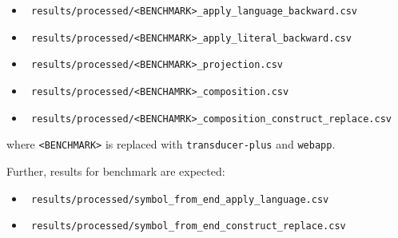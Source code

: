 \begin{itemize}
\begin{itemize}
    \item \texttt{
    results/processed/<BENCHMARK>\_apply\_language\_backward.csv
    }
    \item \texttt{
      results/processed/<BENCHMARK>\_apply\_literal\_backward.csv
    }

    \item \texttt{
results/processed/<BENCHMARK>\_projection.csv
    }

    \item \texttt{
results/processed/<BENCHAMRK>\_composition.csv
    }
    \item \texttt{
results/processed/<BENCHAMRK>\_composition\_construct\_replace.csv
    }

  \end{itemize}
  where \texttt{<BENCHMARK>} is replaced with \texttt{transducer-plus} and \texttt{webapp}.

  Further, results for benchmark \symbolFromEnd are expected:
  \begin{itemize}
    \item \texttt{
      results/processed/symbol\_from\_end\_apply\_language.csv
    }
    \item \texttt{
      results/processed/symbol\_from\_end\_construct\_replace.csv
    }
  \end{itemize}

\end{itemize}








%
